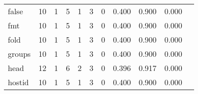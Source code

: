 \begin{longtable}{lp{1.2cm}p{1.2cm}p{1.2cm}p{1.2cm}p{1.2cm}p{1.2cm}p{1.2cm}p{1.2cm}p{1.2cm}p{1.2cm}}
false     &                                    10 &                                                  1 &                                                  5 &                                                  1 &                                                  3 &                                                  0 &                                              0.400 &                                              0.900 &                                              0.000 \\
fmt       &                                    10 &                                                  1 &                                                  5 &                                                  1 &                                                  3 &                                                  0 &                                              0.400 &                                              0.900 &                                              0.000 \\
fold      &                                    10 &                                                  1 &                                                  5 &                                                  1 &                                                  3 &                                                  0 &                                              0.400 &                                              0.900 &                                              0.000 \\
groups    &                                    10 &                                                  1 &                                                  5 &                                                  1 &                                                  3 &                                                  0 &                                              0.400 &                                              0.900 &                                              0.000 \\
head      &                                    12 &                                                  1 &                                                  6 &                                                  2 &                                                  3 &                                                  0 &                                              0.396 &                                              0.917 &                                              0.000 \\
hostid    &                                    10 &                                                  1 &                                                  5 &                                                  1 &                                                  3 &                                                  0 &                                              0.400 &                                              0.900 &                                              0.000 \\

\end{longtable}
